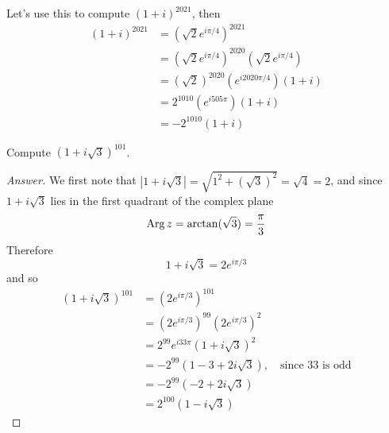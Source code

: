\vspace*{1em}

\begin{example}
Let's use this to compute $(1+i)^{2021}$, then
\begin{align*}
(1 + i)^{2021} &= (\sqrt{2} e^{i\pi/4})^{2021}\\[0.5em]
&= (\sqrt{2} e^{i\pi/4})^{2020}(\sqrt{2} e^{i\pi/4})\\[0.5em]
&= (\sqrt{2})^{2020} (e^{i2020\pi/4})(1 + i)\\[0.5em]
&= 2^{1010} (e^{i505\pi})(1 + i)\\[0.5em]
&= -2^{1010}(1 + i)
\end{align*}
\end{example}


\begin{example}[in-class]
Compute $(1+i\sqrt{3})^{101}$.
\end{example}
\begin{proof}[Answer]
We first note that $|1 + i\sqrt{3}| = \sqrt{1^2 + (\sqrt{3})^2} = \sqrt{4} = 2$, and since $1 + i\sqrt{3}$ lies in the first quadrant of the complex plane
\[\operatorname{Arg} z = \arctan(\sqrt{3}) = \frac{\pi}{3}\]
Therefore
\[1+i\sqrt{3} = 2e^{i\pi/3}\]
and so
\begin{align*}
(1+i\sqrt{3})^{101} &= (2e^{i\pi/3})^{101}\\[0.5em]
 &= (2e^{i\pi/3})^{99}(2e^{i\pi/3})^{2}\\[0.5em]
 &= 2^{99}e^{i33\pi}(1+i\sqrt{3})^{2}\\[0.5em]
 &= -2^{99}(1-3 +2i\sqrt{3}),\quad \text{since $33$ is odd}\\[0.5em]
 &= -2^{99}(-2 +2i\sqrt{3})\\[0.5em]
 &= 2^{100}(1- i\sqrt{3})
\end{align*}
\end{proof}

\vspace*{1em}

